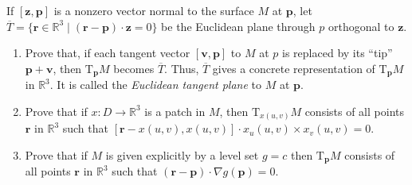 \documentclass[12 pt, letterpaper]{hmcpset}
\begin{document}
\pagebreak

\begin{problem}[Problem 2.]
	If $[\mathbf{z}, \mathbf{p}]$ is a nonzero vector normal to the surface $M$ at $\mathbf{p}$, let $\overline{T} = \{ \mathbf{r} \in \mathbb{R}^{3} \mid (\mathbf{r} - \mathbf{p}) \cdot \mathbf{z} = 0 \}$ be the Euclidean plane through $p$ orthogonal to $\mathbf{z}$.
	\begin{enumerate}
		\item Prove that, if each tangent vector $[\mathbf{v}, \mathbf{p}]$ to $M$ at $p$ is replaced by its ``tip'' $\mathbf{p} + \mathbf{v}$, then $\mathrm{T}_{\mathbf{p}}M$ becomes $\overline{T}$. Thus, $\overline{T}$ gives a concrete representation of $\mathrm{T}_{\mathbf{p}}M$ in $\mathbb{R}^{3}$. It is called the \textit{Euclidean tangent plane} to $M$ at $\mathbf{p}$.
		\item Prove that if $x : D \to \mathbb{R}^{3}$ is a patch in $M$, then $\mathrm{T}_{x(u, v)}M$ consists of all points $\mathbf{r}$ in $\mathbb{R}^{3}$ such that $[\mathbf{r} - x(u, v), x(u, v)] \cdot x_{u}(u, v) \times x_{v}(u, v) = 0$.
		\item Prove that if $M$ is given explicitly by a level set $g = c$ then $\mathrm{T}_{\mathbf{p}} M$ consists of all points $\mathbf{r}$ in $\mathbb{R}^{3}$ such that $(\mathbf{r} - \mathbf{p}) \cdot \nabla g(\mathbf{p}) = 0$.
	\end{enumerate}
\end{problem}
\end{document}
